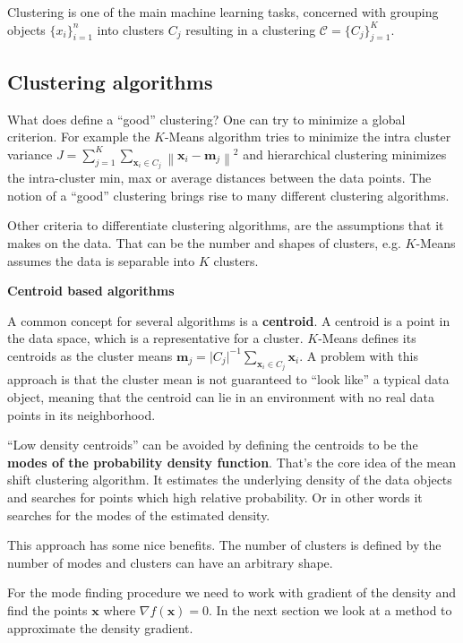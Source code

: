 \documentclass{article}
\newcommand{\norm}[1]{\left\lVert#1\right\rVert}
\begin{document}
Clustering is one of the main machine learning tasks, concerned with grouping objects $\{x_i\}_{i=1}^n$ into clusters $C_j$ resulting in a clustering $\mathcal{C} = \{ C_j \}_{j=1}^K$.

\subsection{Clustering algorithms} \label{sec:clustering-algorithms}

What does define a ``good'' clustering? One can try to minimize a global criterion. For example the $K$-Means algorithm tries to minimize the intra cluster variance $J = \sum_{j=1}^K \sum_{\bm{x}_i \in C_j} \norm{\bm{x}_i - \bm{m}_j}^2$ and hierarchical clustering minimizes the intra-cluster min, max or average distances between the data points. The notion of a ``good'' clustering brings rise to many different clustering algorithms.

Other criteria to differentiate clustering algorithms, are the assumptions that it makes on the data. That can be the number and shapes of clusters, e.g. $K$-Means assumes the data is separable into $K$ clusters. 

\textbf{Centroid based algorithms}

A common concept for several algorithms is a \textbf{centroid}. A centroid is a point in the data space, which is a representative for a cluster. $K$-Means defines its centroids as the cluster means $\bm{m}_j = \lvert C_j \rvert^{-1} \sum_{\bm{x}_i \in C_j} \bm{x}_i$. A problem with this approach is that the cluster mean is not guaranteed to ``look like'' a typical data object, meaning that the centroid can lie in an environment with no real data points in its neighborhood.

``Low density centroids'' can be avoided by defining the centroids to be the \textbf{modes of the probability density function}. That's the core idea of the mean shift clustering algorithm. It estimates the underlying density of the data objects and searches for points which high relative probability. Or in other words it searches for the modes of the estimated density.

This approach has some nice benefits. The number of clusters is defined by the number of modes and clusters can have an arbitrary shape.

For the mode finding procedure we need to work with gradient of the density and find the points $\bm{x}$ where $\nabla f(\bm{x}) = 0$. In the next section we look at a method to approximate the density gradient. 
\end{document}
